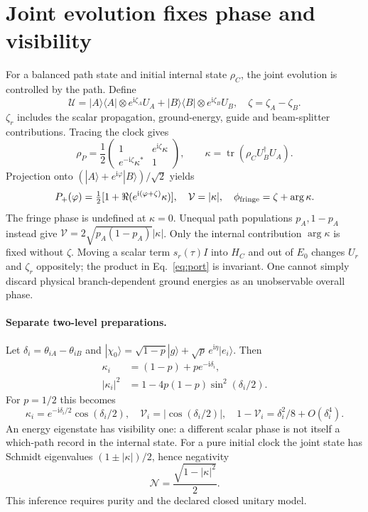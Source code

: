 \documentclass[11pt,a4paper]{article}
\newcommand{\tr}{\operatorname{tr}}
\newcommand{\ii}{\mathrm i}
\begin{document}
\newpage
\section{Joint evolution fixes phase and visibility}
For a balanced path state and initial internal state $\rho_C$, the joint
evolution is controlled by the path. Define
\begin{equation}
 \mathcal U=|A\rangle\langle A|\otimes e^{\ii\zeta_A}U_A
            +|B\rangle\langle B|\otimes e^{\ii\zeta_B}U_B,
 \quad \zeta=\zeta_A-\zeta_B .
\end{equation}
$\zeta_r$ includes the scalar propagation, ground-energy, guide and
beam-splitter contributions. Tracing the clock gives
\begin{equation}\label{eq:reduced}
 \rho_P=\frac12
 \begin{pmatrix}1&e^{\ii\zeta}\kappa\\e^{-\ii\zeta}\kappa^*&1\end{pmatrix},
 \qquad \kappa=\tr(\rho_C U_B^\dagger U_A).
\end{equation}
Projection onto $(|A\rangle+e^{\ii\varphi}|B\rangle)/\sqrt2$ yields
\begin{equation}\label{eq:port}
 P_+(\varphi)=\tfrac12[1+\Re(e^{\ii(\varphi+\zeta)}\kappa)],
 \quad \mathcal V=|\kappa|,\quad
 \phi_{\rm fringe}=\zeta+\arg\kappa .
\end{equation}
The fringe phase is undefined at $\kappa=0$. Unequal path populations
$p_A,1-p_A$ instead give $\mathcal V=2\sqrt{p_A(1-p_A)}|\kappa|$.
Only the internal contribution $\arg\kappa$ is fixed without $\zeta$.
Moving a scalar term $s_r(\tau)I$ into $H_C$ and out of $E_0$ changes
$U_r$ and $\zeta_r$ oppositely; the product in Eq.~\eqref{eq:port}
is invariant. One cannot simply discard physical branch-dependent
ground energies as an unobservable overall phase.

\paragraph{Separate two-level preparations.}
Let $\delta_i=\theta_{iA}-\theta_{iB}$ and
$|\chi_0\rangle=\sqrt{1-p}|g\rangle+\sqrt p\,e^{\ii\eta}|e_i\rangle$.
Then
\begin{align}
 \kappa_i&=(1-p)+pe^{-\ii\delta_i},\\
 |\kappa_i|^2&=1-4p(1-p)\sin^2(\delta_i/2).
\end{align}
For $p=1/2$ this becomes
\begin{equation}
 \kappa_i=e^{-\ii\delta_i/2}\cos(\delta_i/2),\quad
 \mathcal V_i=|\cos(\delta_i/2)|,\quad
 1-\mathcal V_i=\delta_i^2/8+O(\delta_i^4).
\end{equation}
An energy eigenstate has visibility one: a different scalar phase is
not itself a which-path record in the internal state.
For a pure initial clock the joint state has Schmidt eigenvalues
$(1\pm|\kappa|)/2$, hence negativity
\begin{equation}
 \mathcal N=\frac{\sqrt{1-|\kappa|^2}}2 .
\end{equation}
This inference requires purity and the declared closed unitary model.
\end{document}
